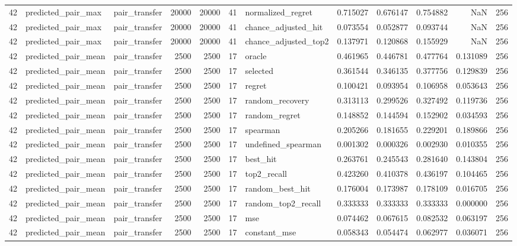 \begin{tabular}{rllrrrlrrrrr}
42 & predicted_pair_max & pair_transfer & 20000 & 20000 & 41 & normalized_regret & 0.715027 & 0.676147 & 0.754882 & NaN & 256 \\
42 & predicted_pair_max & pair_transfer & 20000 & 20000 & 41 & chance_adjusted_hit & 0.073554 & 0.052877 & 0.093744 & NaN & 256 \\
42 & predicted_pair_max & pair_transfer & 20000 & 20000 & 41 & chance_adjusted_top2 & 0.137971 & 0.120868 & 0.155929 & NaN & 256 \\
42 & predicted_pair_mean & pair_transfer & 2500 & 2500 & 17 & oracle & 0.461965 & 0.446781 & 0.477764 & 0.131089 & 256 \\
42 & predicted_pair_mean & pair_transfer & 2500 & 2500 & 17 & selected & 0.361544 & 0.346135 & 0.377756 & 0.129839 & 256 \\
42 & predicted_pair_mean & pair_transfer & 2500 & 2500 & 17 & regret & 0.100421 & 0.093954 & 0.106958 & 0.053643 & 256 \\
42 & predicted_pair_mean & pair_transfer & 2500 & 2500 & 17 & random_recovery & 0.313113 & 0.299526 & 0.327492 & 0.119736 & 256 \\
42 & predicted_pair_mean & pair_transfer & 2500 & 2500 & 17 & random_regret & 0.148852 & 0.144594 & 0.152902 & 0.034593 & 256 \\
42 & predicted_pair_mean & pair_transfer & 2500 & 2500 & 17 & spearman & 0.205266 & 0.181655 & 0.229201 & 0.189866 & 256 \\
42 & predicted_pair_mean & pair_transfer & 2500 & 2500 & 17 & undefined_spearman & 0.001302 & 0.000326 & 0.002930 & 0.010355 & 256 \\
42 & predicted_pair_mean & pair_transfer & 2500 & 2500 & 17 & best_hit & 0.263761 & 0.245543 & 0.281640 & 0.143804 & 256 \\
42 & predicted_pair_mean & pair_transfer & 2500 & 2500 & 17 & top2_recall & 0.423260 & 0.410378 & 0.436197 & 0.104465 & 256 \\
42 & predicted_pair_mean & pair_transfer & 2500 & 2500 & 17 & random_best_hit & 0.176004 & 0.173987 & 0.178109 & 0.016705 & 256 \\
42 & predicted_pair_mean & pair_transfer & 2500 & 2500 & 17 & random_top2_recall & 0.333333 & 0.333333 & 0.333333 & 0.000000 & 256 \\
42 & predicted_pair_mean & pair_transfer & 2500 & 2500 & 17 & mse & 0.074462 & 0.067615 & 0.082532 & 0.063197 & 256 \\
42 & predicted_pair_mean & pair_transfer & 2500 & 2500 & 17 & constant_mse & 0.058343 & 0.054474 & 0.062977 & 0.036071 & 256 \\

\end{tabular}
